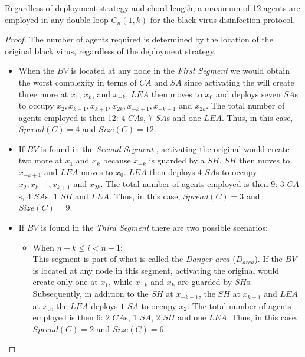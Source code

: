 \begin{theorem}\label{theo:agents}
Regardless of deployment strategy and chord length, a maximum of 12 agents are employed  in any double loop $C_n(1,k)$ for the black virus disinfection protocol.
\end{theorem}
\begin{proof}
The number of agents required is determined by the location of the original black virus, regardless of the deployment strategy.
\begin{itemize} 
\item
When the $BV$ is located at any node in the  {\em First  Segment} we would obtain  the worst complexity in terms of $CA$ and $SA$ since activating the \bv will create three more \bvs at $x_{1}$, $x_{k}$, and $ x_{-k}$. $LEA$ then  moves to $x_{0}$ and deploys seven  $SA$s to occupy $x_{2},x_{k-1},x_{k+1},x_{2k},x_{-k+1},x_{-k-1}$ and $x_{2k}$. The total number of agents employed is then 12:  $4$ $CA$s, $7$  $SA$s and one $LEA$. Thus, in this case,  $Spread(C)=4$ and $Size(C)=12$.   
 
\item If $BV$ is found in the {\em Second  Segment },
activating the original \bv would create two more \bvs at $x_{1}$ and $ x_{k}$ because $x_{-k}$ is guarded by a $SH$. $SH$ then moves to $x_{-k+1}$  and $LEA$ moves to $x_{0}$. $LEA$ then deploys $4$  $SA$s to occupy $x_{2},x_{k-1},x_{k+1}$ and $x_{2k}$. The total number of agents employed is then 9: $3$ $CA$s, $4$  $SA$s, $1$ $SH$ and $LEA$. Thus, in this case,  $Spread(C)=3$ and $Size(C)=9$.
 
\item If $BV$ is found in the {\em Third  Segment } there are two possible scenarios:

\begin{itemize}
\item 
When $n-k \leq i < n-1$:\\ %
This segment is part of what is called  the {\it Danger area} ($D_{area}$).
If the $BV$ is located at any node in this segment, activating the original \bv would create only one \bv at $x_{1}$, while $x_{-k}$ and $x_{k}$ are guarded by $SH$s. Subsequently, in addition to the $SH$ at $x_{-k+1}$, the $SH$ at $x_{k+1}$ and $LEA$ at $x_{0}$, the $LEA$ deploys $1$  $SA$ to occupy $x_{2}$. The total number of agents employed is then 6: $2$ $CA$s, $1$  $SA$, $2$ $SH$ and one $LEA$. Thus, in this case,  $Spread(C)=2$ and $Size(C)=6$.



\end{itemize}
\end{itemize}
\end{proof}
